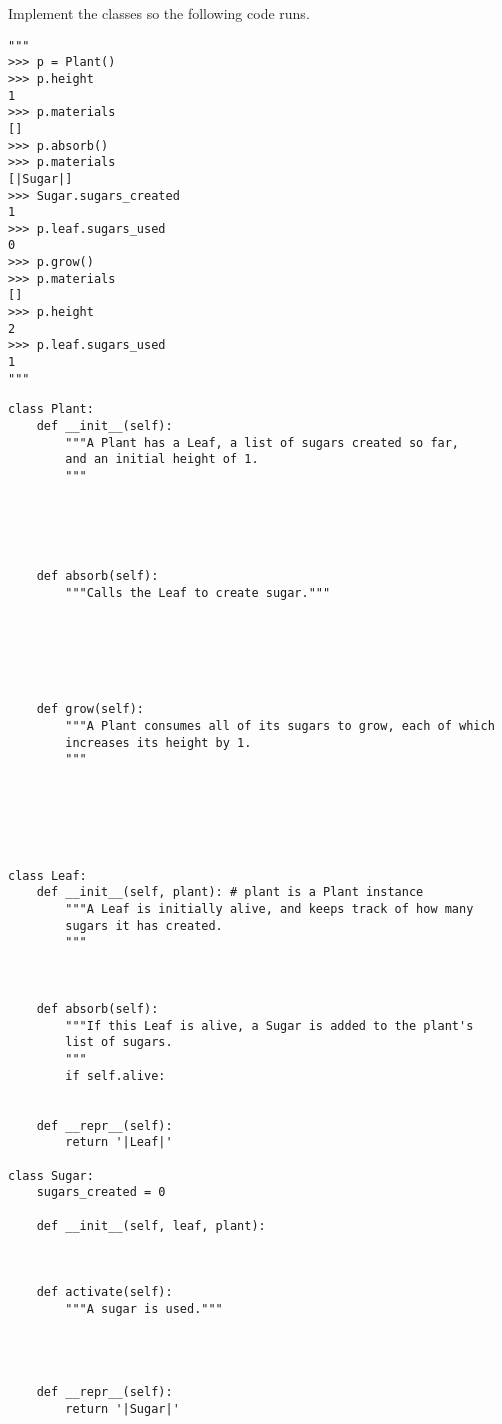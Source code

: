 \begin{blocksection}
\question Implement the classes so the following code runs.

\begin{lstlisting}
"""
>>> p = Plant()
>>> p.height
1
>>> p.materials
[]
>>> p.absorb()
>>> p.materials
[|Sugar|]
>>> Sugar.sugars_created
1
>>> p.leaf.sugars_used
0
>>> p.grow()
>>> p.materials
[]
>>> p.height
2
>>> p.leaf.sugars_used
1
"""
\end{lstlisting}
\end{blocksection}

\ifprintanswers\else
\begin{lstlisting}
class Plant:
    def __init__(self):
        """A Plant has a Leaf, a list of sugars created so far,
        and an initial height of 1.
        """





    def absorb(self):
        """Calls the Leaf to create sugar."""






    def grow(self):
        """A Plant consumes all of its sugars to grow, each of which
        increases its height by 1.
        """






class Leaf:
    def __init__(self, plant): # plant is a Plant instance
        """A Leaf is initially alive, and keeps track of how many
        sugars it has created.
        """



    def absorb(self):
        """If this Leaf is alive, a Sugar is added to the plant's
        list of sugars.
        """
        if self.alive:


    def __repr__(self):
        return '|Leaf|'

class Sugar:
    sugars_created = 0

    def __init__(self, leaf, plant):



    def activate(self):
        """A sugar is used."""




    def __repr__(self):
        return '|Sugar|'
\end{lstlisting}
\fi

